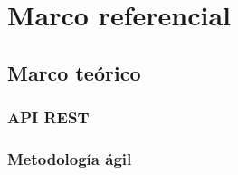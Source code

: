 \section{Marco referencial}









\subsection{Marco teórico}



\subsubsection{API REST}
\subsubsection{Metodología ágil} %


